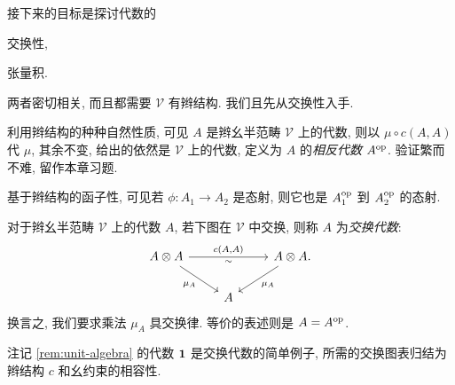 接下来的目标是探讨代数的
\begin{inparaenum}[(a)]
	\item 交换性,
	\item 张量积.
\end{inparaenum}
两者密切相关, 而且都需要 $\mathcal{V}$ 有辫结构. 我们且先从交换性入手.

\begin{definition}\label{def:opposite-braided-algebra}
	利用辫结构的种种自然性质, 可见 $A$ 是辫幺半范畴 $\mathcal{V}$ 上的代数, 则以 $\mu \circ c(A, A)$ 代 $\mu$, 其余不变, 给出的依然是 $\mathcal{V}$ 上的代数, 定义为 $A$ 的\emph{相反代数} $A^{\operatorname{op}}$. 验证繁而不难, 留作本章习题.
\end{definition}

基于辫结构的函子性, 可见若 $\phi: A_1 \to A_2$ 是态射, 则它也是 $A_1^{\operatorname{op}}$ 到 $A_2^{\operatorname{op}}$ 的态射.

\begin{definition}\label{def:calg-monoidal}
	对于辫幺半范畴 $\mathcal{V}$ 上的代数 $A$, 若下图在 $\mathcal{V}$ 中交换, 则称 $A$ 为\emph{交换代数}:
	\[\begin{tikzcd}
		A \otimes A \arrow[rd, "{\mu_A}"'] \arrow[rr, "{c(A, A)}", "\sim"'] & & A \otimes A . \arrow[ld, "{\mu_A}"] \\
		& A &
	\end{tikzcd}\]
	换言之, 我们要求乘法 $\mu_A$ 具交换律. 等价的表述则是 $A = A^{\operatorname{op}}$.
\end{definition}

注记 \ref{rem:unit-algebra} 的代数 $\bm{1}$ 是交换代数的简单例子, 所需的交换图表归结为辫结构 $c$ 和幺约束的相容性.

